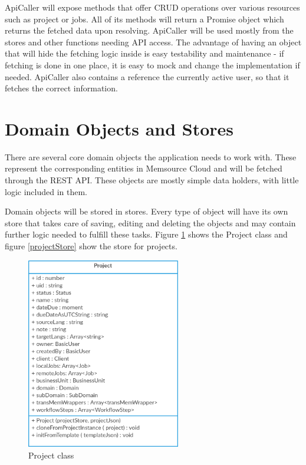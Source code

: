ApiCaller will expose methods that offer CRUD operations over various resources such as project or jobs. All of its methods will return a Promise object which returns the fetched data upon resolving. ApiCaller will be used mostly from the stores and other functions needing API access. The advantage of having an object that will hide the fetching logic inside is easy testability and maintenance - if fetching is done in one place, it is easy to mock and change the implementation if needed. ApiCaller also contains a reference the currently active user, so that it fetches the correct information.


\section{Domain Objects and Stores}\label{sec:stores}

There are several core domain objects the application needs to work with. These represent the corresponding entities in Memsource Cloud and will be fetched through the REST API. These objects are mostly simple data holders, with little logic included in them. 

Domain objects will be stored in stores. Every type of object will have its own store that takes care of saving, editing and deleting the objects and may contain further logic needed to fulfill these tasks.
Figure \ref{Project} shows the Project class and figure \ref{projectStore} show the store for projects. 

\begin{figure}[H]
	\includegraphics[width=0.6\textwidth]{pics/Project}
	\caption{Project class}
	\label{Project}
\end{figure}


